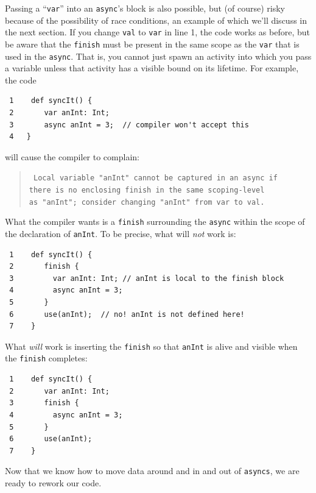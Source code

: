 Passing a ``{\tt var}'' into an {\tt async}'s block is also possible, but (of
course) risky because of the possibility of race conditions, an example of which
we'll discuss in the next section. If you change {\tt val} to {\tt var} in
line 1, the code works as before, but be aware that the {\tt finish} must be
present in the same scope as the {\tt var} that is used in the {\tt async}. 
That is, you cannot just spawn an activity into which you pass a variable 
unless that activity has a visible bound on its lifetime.  For example, the
code
\begin{verbatim} 
 1    def syncIt() {
 2       var anInt: Int;
 3       async anInt = 3;  // compiler won't accept this
 4   }
\end{verbatim}
will cause the compiler to complain:
\begin{quote}{\tt
Local variable "anInt" cannot be captured in an async if\\
there is no enclosing finish in the same scoping-level\\
as "anInt"; consider changing "anInt" from var to val.}
\end{quote}
What the compiler wants is a {\tt finish} surrounding the {\tt async} within the
scope of the declaration of {\tt anInt}.  To be precise, what will {\em not}
work is:
\begin{verbatim} 
 1    def syncIt() {
 2       finish {
 3         var anInt: Int; // anInt is local to the finish block
 4         async anInt = 3;
 5       }
 6       use(anInt);  // no! anInt is not defined here!
 7    }
\end{verbatim}
What {\em will} work is inserting the {\tt finish} so that {\tt anInt} is alive
and visible when the {\tt finish} completes:
\begin{verbatim} 
 1    def syncIt() {
 2       var anInt: Int;
 3       finish {
 4         async anInt = 3;
 5       }
 6       use(anInt);
 7    }
\end{verbatim}

Now that we know how to move data around and in and out of {\tt asyncs}, we are
ready to rework our code.
 
